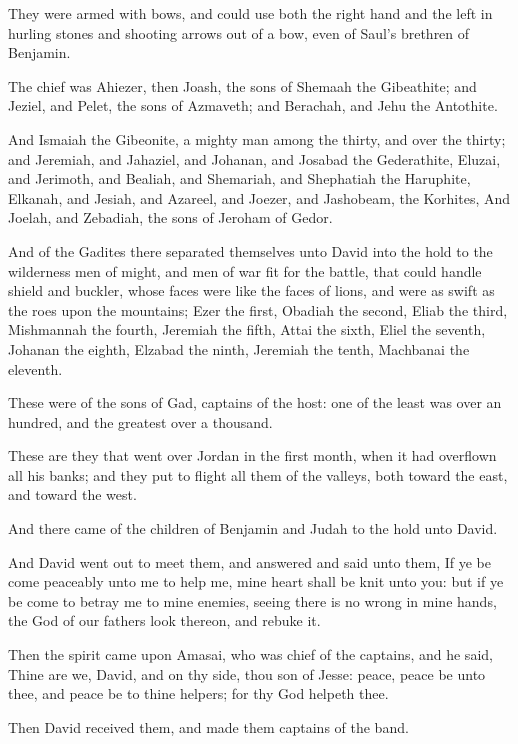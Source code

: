 \Verse They were armed with bows, and could use both the right hand and the left in hurling stones and shooting arrows out of a bow, even of Saul's brethren of Benjamin.

\Verse The chief was Ahiezer, then Joash, the sons of Shemaah the Gibeathite; and Jeziel, and Pelet, the sons of Azmaveth; and Berachah, and Jehu the Antothite.

\Verse And Ismaiah the Gibeonite, a mighty man among the thirty, and over the thirty; and Jeremiah, and Jahaziel, and Johanan, and Josabad the Gederathite, \Verse Eluzai, and Jerimoth, and Bealiah, and Shemariah, and Shephatiah the Haruphite, \Verse Elkanah, and Jesiah, and Azareel, and Joezer, and Jashobeam, the Korhites, \Verse And Joelah, and Zebadiah, the sons of Jeroham of Gedor.

\Verse And of the Gadites there separated themselves unto David into the hold to the wilderness men of might, and men of war fit for the battle, that could handle shield and buckler, whose faces were like the faces of lions, and were as swift as the roes upon the mountains; \Verse Ezer the first, Obadiah the second, Eliab the third, \Verse Mishmannah the fourth, Jeremiah the fifth, \Verse Attai the sixth, Eliel the seventh, \Verse Johanan the eighth, Elzabad the ninth, \Verse Jeremiah the tenth, Machbanai the eleventh.

\Verse These were of the sons of Gad, captains of the host: one of the least was over an hundred, and the greatest over a thousand.

\Verse These are they that went over Jordan in the first month, when it had overflown all his banks; and they put to flight all them of the valleys, both toward the east, and toward the west.

\Verse And there came of the children of Benjamin and Judah to the hold unto David.

\Verse And David went out to meet them, and answered and said unto them, If ye be come peaceably unto me to help me, mine heart shall be knit unto you: but if ye be come to betray me to mine enemies, seeing there is no wrong in mine hands, the God of our fathers look thereon, and rebuke it.

\Verse Then the spirit came upon Amasai, who was chief of the captains, and he said, Thine are we, David, and on thy side, thou son of Jesse: peace, peace be unto thee, and peace be to thine helpers; for thy God helpeth thee.

Then David received them, and made them captains of the band.

